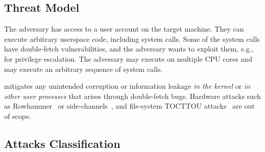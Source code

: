 \documentclass[letterpaper,twocolumn,10pt, anonymous]{article}
\begin{document}
\subsection{Threat Model}
\label{sec:threatmodel}

The adversary has access to a user account on the target machine. They can
execute arbitrary userspace code, including system calls. Some of the system 
calls have double-fetch vulnerabilities, and the adversary wants to exploit them,
e.g., for privilege escalation.
The adversary may execute on multiple CPU cores and may execute an arbitrary 
sequence of system calls. 

\tiktok mitigates any unintended corruption or information leakage \emph{in the kernel}
or \emph{in other user processes} that arises through double-fetch bugs. 
Hardware attacks such as Rowhammer~\cite{mutlu2019rowhammer}
or side-channels~\cite{kocher2019spectre}, and file-system TOCTTOU
attacks~\cite{payer2012protecting, pu2006methodical, wei2010modeling,
tsafrir2008portably} are out of scope.

\subsection{Attacks Classification}
\label{sec:attacks}
\end{document}
